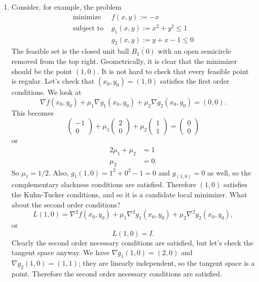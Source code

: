 \documentclass[11pt]{article}
\begin{document}
\begin{enumerate}
\item
Consider, for example, the problem
\begin{align*}
\text{minimize } &f(x,y) := -x \\
\text{subject to } &g_1(x,y) := x^2+y^2 \leq 1 \\
&g_2(x,y) := y+x-1 \leq 0
\end{align*}
The feasible set is the closed unit ball $\overline{B_1(0)}$ with an open semicircle removed from the top right. Geometrically, it is clear that the minimizer should be the point $(1,0)$. It is not hard to check that every feasible point is regular. Let's check that $(x_0, y_0) = (1,0)$ satisfies the first order conditions. We look at
\[
\nabla f (x_0, y_0) + \mu_1 \nabla g_1 (x_0, y_0) + \mu_2 \nabla g_2 (x_0, y_0) = (0,0).
\]
This becomes
\[
\begin{pmatrix}
-1 \\ 0
\end{pmatrix} + \mu_1 \begin{pmatrix}
2 \\ 0
\end{pmatrix} + \mu_2 \begin{pmatrix}
1 \\ 1
\end{pmatrix} = \begin{pmatrix}
0 \\ 0
\end{pmatrix}
\]
or
\begin{align*}
2\mu_1 + \mu_2 &= 1 \\
\mu_2 &= 0.
\end{align*}
So $\mu_1 = 1/2$. Also, $g_1(1,0) = 1^2 + 0^2 - 1 = 0$ and $g_(1,0) = 0$ as well, so the complementary slackness conditions are satisfied. Therefore $(1,0)$ satisfies the Kuhn-Tucker conditions, and so it is a candidate local minimizer. What about the second order conditions?
\[
L(1,0) = \nabla^2 f (x_0, y_0) + \mu_1 \nabla^2 g_1 (x_0, y_0) + \mu_2 \nabla^2 g_2 (x_0, y_0),
\]
or
\[
L(1,0) = I.
\]
Clearly the second order necessary conditions are satisfied, but let's check the tangent space anyway. We have $\nabla g_1(1,0) = (2, 0)$ and $\nabla g_2(1,0) = (1,1)$; they are linearly independent, so the tangent space is a point. Therefore the second order necessary conditions are satisfied.


\end{enumerate}
\end{document}
